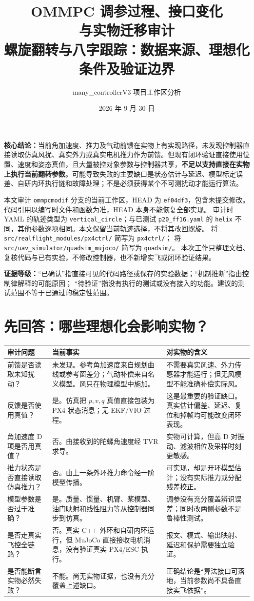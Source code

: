 \documentclass[UTF8,a4paper,11pt,fontset=fandol]{ctexart}
\title{\textbf{OMMPC 调参过程、接口变化\\与实物迁移审计}\\[5pt]
\large 螺旋翻转与八字跟踪：数据来源、理想化条件及验证边界}
\author{many\_controllerV3 项目工作区分析}
\date{2026 年 9 月 30 日}
\newcommand{\code}[1]{{\small\nolinkurl{#1}}}
\newcommand{\note}[1]{\par\noindent\colorbox{panel}{\parbox{\dimexpr\linewidth-2\fboxsep}{#1}}\par}
\begin{document}
\maketitle

\note{\textbf{核心结论：}当前角加速度、推力及气动前馈在实物上有实现路径，未发现控制器直接读取仿真风扰、真实外力或真实电机推力作为前馈。但现有闭环验证直接使用位置、速度和姿态真值，且大量被控对象参数与控制器共享，\textbf{不足以支持直接在实物上执行当前翻转参数}。可能导致失败的主要缺口是状态估计与延迟、模型标定误差、自研内环执行链和故障处理；不是必须获得某个不可测扰动才能运行算法。}

本文审计 \code{ommpcmodif} 分支的当前工作区，HEAD 为 \code{ef04df3}，包含未提交修改。
代码引用以编写时文件和函数为准，HEAD 本身不能恢复全部实现。
审计时 YAML 的轨迹类型为 \code{vertical_circle}；与已测试 \code{p20_ff16.yaml} 的
\code{helix} 不同，其他参数逐项相同。本文保留当前轨迹选择，不将其改回螺旋。
将 \code{src/realflight_modules/px4ctrl/} 简写为 \code{px4ctrl/}；
将 \code{src/uav_simulator/quadsim_mujoco/} 简写为 \code{quadsim/}。
本次工作只整理文档、复核代码与已有实验，不修改控制器，也不新增实飞或闭环验证结果。

\textbf{证据等级：}“已确认”指直接可见的代码路径或保存的实验数据；“机制推断”指由控制律解释的可能原因；
“待验证”指没有执行的测试或没有接入的功能。建议的测试范围不等于已通过的稳定性范围。

\clearpage
\setcounter{tocdepth}{1}
\tableofcontents
\clearpage
\section{先回答：哪些理想化会影响实物？}
\begin{longtable}{L{3.1cm}L{6.1cm}L{6.0cm}}
\toprule 审计问题 & 当前事实 & 对实物的含义\\\midrule\endhead
前馈是否读取未知扰动？ & 未发现。参考角加速度来自规划曲线或参考窗差分；气动补偿来自名义模型。风只在物理模型中施加。 & 不需要真实风速、外力传感器才能运行；但无风模型不能准确补偿实际风。\\
反馈是否使用真值？ & 是。仿真把 $p,v,q$ 真值直接包装为 PX4 状态消息；无 EKF/VIO 过程。 & 这是最重要的验证缺口。真实估计偏差、延迟、复位和掉帧均可能改变闭环表现。\\
角加速度 D 项是否用真值？ & 否。由接收到的陀螺角速度经 TVR 求导。 & 实物可计算，但高 D 对振动、滤波相位及采样时刻更敏感。\\
推力状态是否直接读取仿真推力？ & 否。由上一条外环推力命令经一阶模型传播。 & 可实现，却是开环模型估计；没有实际推力或分配残差校正。\\
模型参数是否过于准确？ & 是。质量、惯量、机臂、桨模型、油门映射和线性阻力等从控制器同步到仿真。 & 调参没有充分覆盖辨识误差；同时改两侧参数不是鲁棒性测试。\\
是否走真实飞控全链路？ & 否。真实 C++ 外环和自研内环运行，但 MuJoCo 直接接收电机消息，没有验证真实 PX4/ESC 执行。 & 报文、模式、输出映射、延迟和保护需要独立验证。\\
是否能断言实物必然失败？ & 不能。尚无实物证据，也没有充分覆盖上述缺口。 & 正确结论是“算法接口可落地，当前参数尚不具备直接实飞依据”。\\
\bottomrule
\end{longtable}
\end{document}
